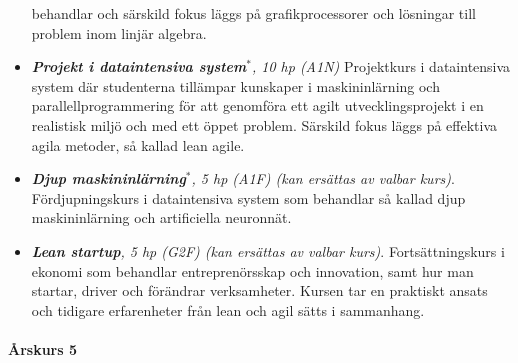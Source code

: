 \begin{itemize}
  behandlar och särskild fokus läggs på grafikprocessorer och lösningar
  till problem inom linjär algebra.
\item
  \emph{\textbf{Projekt i dataintensiva system}$^*$, 10 hp (A1N)}
  Projektkurs i dataintensiva system där studenterna tillämpar kunskaper
  i maskininlärning och parallellprogrammering för att genomföra
  ett agilt utvecklingsprojekt i en realistisk miljö och med ett öppet
  problem. Särskild fokus läggs på effektiva agila metoder, så kallad
  lean agile.
\item
  \emph{\textbf{Djup maskininlärning}$^*$, 5 hp (A1F) (kan ersättas av valbar kurs)}. Fördjupningskurs i dataintensiva system som behandlar
  så kallad djup maskininlärning och artificiella neuronnät.
\item
  \emph{\textbf{Lean startup}, 5 hp (G2F) (kan ersättas av valbar kurs)}. Fortsättningskurs i ekonomi som behandlar entreprenörsskap och innovation, samt hur man startar, driver och förändrar verksamheter. Kursen tar en praktiskt ansats och tidigare erfarenheter från lean och agil sätts i sammanhang.
\end{itemize}

\paragraph*{Årskurs 5}

